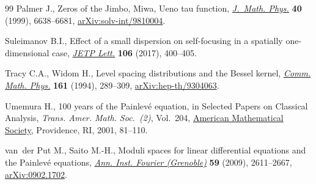 \documentclass[pdftex]{sigma}
\numberwithin{equation}{section}
\begin{document}
\begin{thebibliography}{99}
Palmer J., Zeros of the {J}imbo, {M}iwa, {U}eno tau function, \href{https://doi.org/10.1063/1.533112}{\textit{J.~Math.
 Phys.}} \textbf{40} (1999), 6638--6681, \href{https://arxiv.org/abs/solv-int/9810004}{arXiv:solv-int/9810004}.

Suleimanov B.I., Effect of a small dispersion on self-focusing in a spatially
 one-dimensional case, \href{https://doi.org/10.1134/S0021364017180126}{\textit{JETP Lett.}} \textbf{106} (2017), 400--405.

Tracy C.A., Widom H., Level spacing distributions and the {B}essel kernel,
 \href{https://doi.org/10.1007/BF02099779}{\textit{Comm. Math. Phys.}} \textbf{161} (1994), 289--309,
 \href{https://arxiv.org/abs/hep-th/9304063}{arXiv:hep-th/9304063}.

Umemura H., 100 years of the {P}ainlev\'e equation, in Selected {P}apers on
 {C}lassical {A}nalysis, \textit{Trans. Amer. Math. Soc.~(2)}, Vol.~204,
 \href{https://doi.org/10.1090/trans2/204}{American Mathematical Society}, Providence, RI, 2001, 81--110.

van~der Put M., Saito M.-H., Moduli spaces for linear differential equations and
 the {P}ainlev\'e equations, \href{https://doi.org/10.5802/aif.2502}{\textit{Ann. Inst. Fourier (Grenoble)}}
 \textbf{59} (2009), 2611--2667, \href{https://arxiv.org/abs/0902.1702}{arXiv:0902.1702}.

\end{thebibliography}\LastPageEnding
\end{document}

